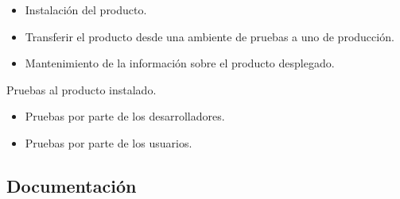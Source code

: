 \begin{description}
\begin{itemize}
			\item Instalación del producto.
			\item Transferir el producto desde una ambiente de pruebas a uno de producción.
			\item Mantenimiento de la información sobre el producto desplegado.
		\end{itemize}
	\item Pruebas al producto instalado.
		\begin{itemize}
			\item Pruebas por parte de los desarrolladores.
			\item Pruebas por parte de los usuarios.
		\end{itemize}
\end{description}

\subsection{Documentación}\label{sec:doc}


